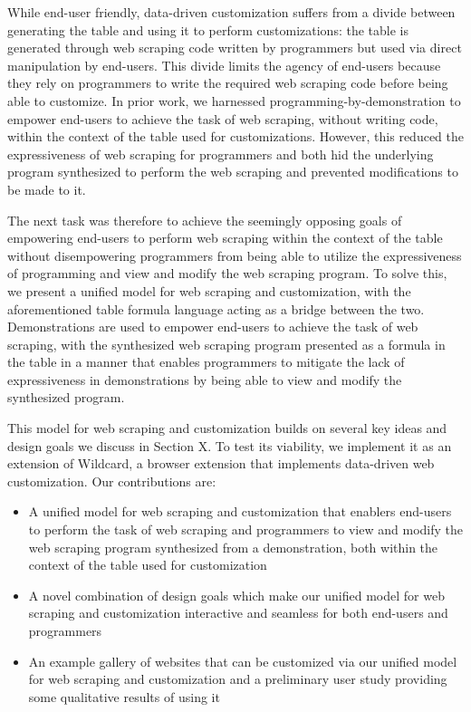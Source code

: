 \documentclass[sigconf,10pt]{acmart}
\providecommand{\tightlist}{%
  \setlength{\itemsep}{0pt}\setlength{\parskip}{0pt}}
\begin{document}
While end-user friendly, data-driven customization suffers from a divide
between generating the table and using it to perform customizations: the
table is generated through web scraping code written by programmers but
used via direct manipulation by end-users. This divide limits the agency
of end-users because they rely on programmers to write the required web
scraping code before being able to customize. In prior work, we
harnessed programming-by-demonstration to empower end-users to achieve
the task of web scraping, without writing code, within the context of
the table used for customizations. However, this reduced the
expressiveness of web scraping for programmers and both hid the
underlying program synthesized to perform the web scraping and prevented
modifications to be made to it.

The next task was therefore to achieve the seemingly opposing goals of
empowering end-users to perform web scraping within the context of the
table without disempowering programmers from being able to utilize the
expressiveness of programming and view and modify the web scraping
program. To solve this, we present a unified model for web scraping and
customization, with the aforementioned table formula language acting as
a bridge between the two. Demonstrations are used to empower end-users
to achieve the task of web scraping, with the synthesized web scraping
program presented as a formula in the table in a manner that enables
programmers to mitigate the lack of expressiveness in demonstrations by
being able to view and modify the synthesized program.

This model for web scraping and customization builds on several key
ideas and design goals we discuss in Section X. To test its viability,
we implement it as an extension of Wildcard, a browser extension that
implements data-driven web customization. Our contributions are:

\begin{itemize}
\tightlist
\item
  A unified model for web scraping and customization that enablers
  end-users to perform the task of web scraping and programmers to view
  and modify the web scraping program synthesized from a demonstration,
  both within the context of the table used for customization
\item
  A novel combination of design goals which make our unified model for
  web scraping and customization interactive and seamless for both
  end-users and programmers
\item
  An example gallery of websites that can be customized via our unified
  model for web scraping and customization and a preliminary user study
  providing some qualitative results of using it
\end{itemize}
\end{document}
